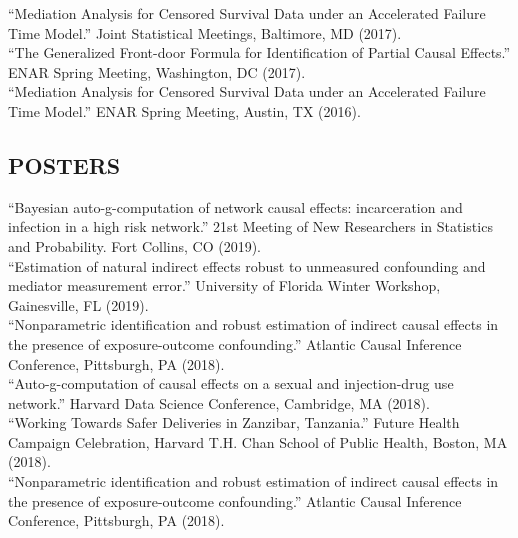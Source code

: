 \documentclass[12pt]{article}
\begin{document}
``Mediation Analysis for Censored Survival Data under an Accelerated Failure Time Model.'' Joint Statistical Meetings, Baltimore, MD (2017). \\

``The Generalized Front-door Formula for Identification of Partial Causal Effects.'' ENAR Spring Meeting, Washington, DC (2017). \\

``Mediation Analysis for Censored Survival Data under an Accelerated Failure Time Model.'' ENAR Spring Meeting, Austin, TX (2016). 

\subsection*{\textbf{ POSTERS}}

``Bayesian auto-g-computation of network causal effects: incarceration and infection in a high risk network.'' 21st Meeting of New Researchers in 
Statistics and Probability. Fort Collins, CO (2019). \\

``Estimation of natural indirect effects robust to unmeasured confounding and mediator measurement error.'' University of Florida Winter Workshop, Gainesville, FL (2019). \\

``Nonparametric identification and robust estimation of indirect causal effects in the presence of exposure-outcome confounding.'' Atlantic Causal Inference Conference, Pittsburgh, PA (2018). \\

``Auto-g-computation of causal effects on a sexual and injection-drug use network.'' Harvard Data Science Conference, Cambridge, MA (2018). \\

``Working Towards Safer Deliveries in Zanzibar, Tanzania.'' Future Health Campaign Celebration, Harvard T.H. Chan School of Public Health, Boston, MA (2018). \\

``Nonparametric identification and robust estimation of indirect causal effects in the presence of exposure-outcome confounding.'' Atlantic Causal Inference Conference, Pittsburgh, PA (2018). 

\end{document}
